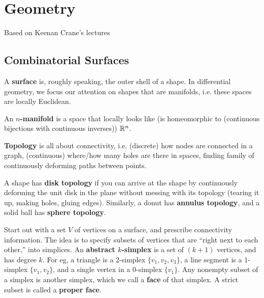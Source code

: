 \chapter{Geometry}

Based on Keenan Crane's lectures

\section{Combinatorial Surfaces}

\begin{definition}[Surface]
A \textbf{surface} is, roughly speaking, the outer shell of a shape. In differential geometry, we focus our attention on shapes that are manifolds, i.e. these spaces are locally Euclidean.
\end{definition}

\begin{definition}[Manifold]
    An \textbf{$n$-manifold} is a space that locally looks like (is homeomorphic to (continuous bijections with continuous inverses)) $\mathbb{R}^n$.
\end{definition}

\begin{definition}[Topology]
     \textbf{Topology} is all about connectivity, i.e. (discrete) how nodes are connected in a graph, (continuous) where/how many holes are there in spaces, finding family of continuously deforming paths between points.
\end{definition}

\begin{definition}
    A shape has \textbf{disk topology} if you can arrive at the shape by continuously deforming the unit disk in the plane without messing with its topology (tearing it up, making holes, gluing edges). Similarly, a donut has \textbf{annulus topology}, and a solid ball has \textbf{sphere topology}.
\end{definition}

\begin{definition}[Simplices]
    Start out with a set $V$ of vertices on a surface, and prescribe connectivity information. The idea is to specify subsets of vertices that are ``right next to each other,'' into simplices. An \textbf{abstract $k$-simplex} is a set of $(k+1)$ vertices, and has degree $k$. For eg, a triangle is a $2$-simplex $\{v_1,v_2,v_3\}$, a line segment is a $1$-simplex $\{v_1,v_2\}$, and a single vertex in a $0$-simplex $\{v_1\}$. Any nonempty subset of a simplex is another simplex, which we call a \textbf{face} of that simplex. A strict subset is called a \textbf{proper face}.
\end{definition}

